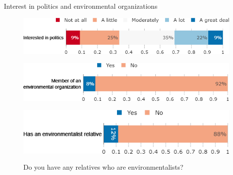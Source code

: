 \documentclass[aspectratio=169,9pt,dvipsnames]{beamer}
\begin{document}
\begin{frame}{Interest in politics and environmental organizations}%
\vspace{-.5cm}
\begin{figure}[h!]
\caption{To what extent are you interested in politics?}
\includegraphics[width=.6\textwidth]{../figures/DK/interested_politics_DK.png} \\
\vspace{.1cm}
\caption{Are you member of an environmental organization?}
\includegraphics[width=.54\textwidth]{../figures/DK/member_environmental_orga_DK.png}\\
\vspace{.1cm}
\caption{Do you have any relatives who are environmentalists?}
\includegraphics[width=.54\textwidth]{../figures/DK/relative_environmentalist_DK.png}\\
\end{figure}
\end{frame}
\end{document}

